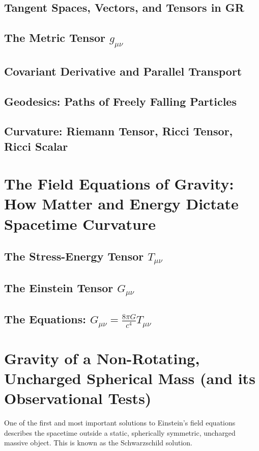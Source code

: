 \documentclass{amsart}
\theoremstyle{definition}
\theoremstyle{remark}
\begin{document}
\subsection{Tangent Spaces, Vectors, and Tensors in GR}
\subsection{The Metric Tensor $g_{\mu\nu}$}
\subsection{Covariant Derivative and Parallel Transport}
\subsection{Geodesics: Paths of Freely Falling Particles}
\subsection{Curvature: Riemann Tensor, Ricci Tensor, Ricci Scalar}

\section{The Field Equations of Gravity: How Matter and Energy Dictate Spacetime Curvature}
\label{sec:efe}
\subsection{The Stress-Energy Tensor $T_{\mu\nu}$}
\subsection{The Einstein Tensor $G_{\mu\nu}$}
\subsection{The Equations: $G_{\mu\nu} = \frac{8\pi G}{c^4} T_{\mu\nu}$}

\section{Gravity of a Non-Rotating, Uncharged Spherical Mass (and its Observational Tests)}
\label{sec:schwarzschild_tests}
One of the first and most important solutions to Einstein's field equations describes the spacetime outside a static, spherically symmetric, uncharged massive object.
This is known as the Schwarzschild solution.
\end{document}
